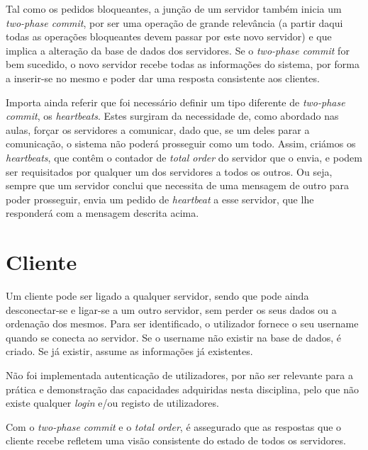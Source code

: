 \documentclass[a4paper]{report}
\begin{document}
		Tal como os pedidos bloqueantes, a junção de um servidor também inicia um \textit{two-phase commit}, por ser uma operação de grande relevância 
		(a partir daqui todas as operações bloqueantes devem passar por este novo servidor) e que implica a alteração da base de dados dos servidores.
		Se o \textit{two-phase commit} for bem sucedido, o novo servidor recebe todas as informações do sistema, por forma a inserir-se no mesmo e poder dar uma resposta consistente aos clientes.

		Importa ainda referir que foi necessário definir um tipo diferente de \textit{two-phase commit}, os \textit{heartbeats}. Estes surgiram da necessidade de, como abordado nas aulas, forçar os servidores a comunicar, dado que, se um deles parar a comunicação, o sistema não poderá prosseguir como um todo. Assim, criámos os \textit{heartbeats}, que contêm o contador de \textit{total order} do servidor que o envia, e podem ser requisitados por qualquer um dos servidores a todos os outros. Ou seja, sempre que um servidor conclui que necessita de uma mensagem de outro para poder prosseguir, envia um pedido de \textit{heartbeat} a esse servidor, que lhe responderá com a mensagem descrita acima.

	\section{Cliente}
		Um cliente pode ser ligado a qualquer servidor, sendo que pode ainda desconectar-se e ligar-se a um outro servidor, sem perder os seus dados ou a ordenação dos mesmos.
		Para ser identificado, o utilizador fornece o seu username quando se conecta ao servidor. Se o username não existir na base de dados, é criado. Se já existir, assume as informações já existentes.

		Não foi implementada autenticação de utilizadores, por não ser relevante para a prática e demonstração das capacidades adquiridas nesta disciplina, pelo que não existe qualquer \textit{login} e/ou registo de utilizadores.

		Com o \textit{two-phase commit} e o \textit{total order}, é assegurado que as respostas que o cliente recebe refletem uma visão consistente do estado de todos os servidores.
\end{document}
